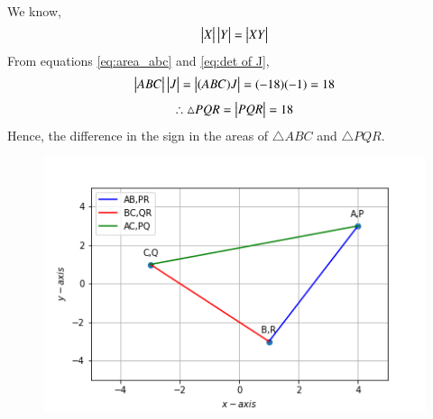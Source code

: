 \documentclass[journal,12pt,twocolumn]{IEEEtran}
\renewcommand\thesection{\arabic{section}}
\begin{document}
\begin{enumerate}[label=\thesection.\arabic*.,ref=\thesection.\theenumi]
\begin{align}
\end{align}
We know,\begin{equation}\label{eq:det_prop}
\begin{vmatrix}X\end{vmatrix}\begin{vmatrix}Y\end{vmatrix}=\begin{vmatrix}XY\end{vmatrix}
\end{equation}
From equations \eqref{eq:area_abc} and \eqref{eq:det of J},
\begin{equation}
\begin{vmatrix}ABC\end{vmatrix}\begin{vmatrix}J\end{vmatrix}=\begin{vmatrix}(ABC)J\end{vmatrix}=(-18)(-1)=18
\end{equation}
\begin{align}\label{eq:area_pqr}
\therefore\triangle PQR=\begin{vmatrix}PQR\end{vmatrix}=18
\end{align}
Hence, the difference in the sign in the areas of $\triangle ABC$ and $\triangle PQR$.
\begin{figure}[!ht]
	\centering
	\includegraphics[scale=0.7]{triangle.png}
\end{figure}
\end{enumerate}
\end{document}
